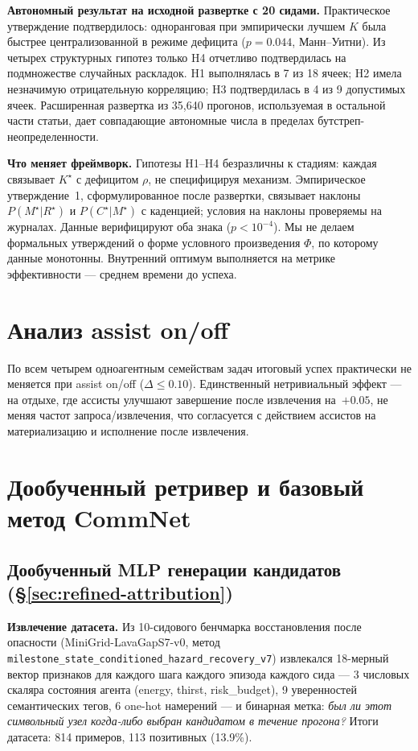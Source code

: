 \documentclass{article}
\begin{document}
\textbf{Автономный результат на исходной развертке с 20 сидами.}
Практическое утверждение подтвердилось: одноранговая при эмпирически лучшем $K$ была быстрее централизованной в режиме дефицита ($p = 0.044$, Манн--Уитни). Из четырех структурных гипотез только H4 отчетливо подтвердилась на подмножестве случайных раскладок. H1 выполнялась в 7 из 18 ячеек; H2 имела незначимую отрицательную корреляцию; H3 подтвердилась в 4 из 9 допустимых ячеек. Расширенная развертка из 35{,}640 прогонов, используемая в остальной части статьи, дает совпадающие автономные числа в пределах бутстреп-неопределенности.

\textbf{Что меняет фреймворк.}
Гипотезы H1--H4 безразличны к стадиям: каждая связывает $K^\star$ с дефицитом $\rho$, не специфицируя механизм. Эмпирическое утверждение~1, сформулированное после развертки, связывает наклоны $P(M^\star|R^\star)$ и $P(C^\star|M^\star)$ с каденцией; условия на наклоны проверяемы на журналах. Данные верифицируют оба знака ($p<10^{-4}$). Мы не делаем формальных утверждений о форме условного произведения $\Phi$, по которому данные монотонны. Внутренний оптимум выполняется на метрике эффективности --- среднем времени до успеха.

\section{Анализ assist on/off}
\label{app:assist}

По всем четырем одноагентным семействам задач итоговый успех практически не меняется при assist on/off ($\Delta \le 0.10$). Единственный нетривиальный эффект --- на отдыхе, где ассисты улучшают завершение после извлечения на~$+0.05$, не меняя частот запроса/извлечения, что согласуется с действием ассистов на материализацию и исполнение после извлечения.

\section{Дообученный ретривер и базовый метод CommNet}
\label{app:learned-baselines}

\subsection{Дообученный MLP генерации кандидатов (\S\ref{sec:refined-attribution})}

\textbf{Извлечение датасета.} Из 10-сидового бенчмарка восстановления после опасности
(MiniGrid-LavaGapS7-v0, метод \texttt{milestone\_state\_conditioned\_hazard\_recovery\_v7})
извлекался 18-мерный вектор признаков для каждого шага каждого эпизода каждого сида --- 3 числовых скаляра состояния агента (energy, thirst, risk\_budget),
9 уверенностей семантических тегов, 6 one-hot намерений --- и бинарная метка: \emph{был
ли этот символьный узел когда-либо выбран кандидатом в течение прогона?} Итоги датасета:
814 примеров, 113 позитивных (13.9\%).
\end{document}
